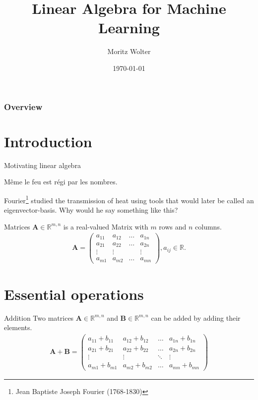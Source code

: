 \documentclass[notes=only]{beamer}
\title{Linear Algebra for Machine Learning}
\date{\today}
\institute{High-Performance Computing and Analytics Lab, University of Bonn}
\author{Moritz Wolter}
\begin{document}
    \maketitle

    \begin{frame}
    \frametitle{Overview} 
    \tableofcontents
    \end{frame}

    \section{Introduction}
    \begin{frame}{Motivating linear algebra}
      \begin{displayquote}
        Même le feu est régi par les nombres.
      \end{displayquote}
      Fourier\footnote{Jean Baptiste Joseph Fourier (1768-1830)} studied the transmission of heat using tools that would later be called
      an eigenvector-basis.
      Why would he say something like this?
    \end{frame}

    \begin{frame}{Matrices}
      $\mathbf{A} \in \mathbb{R}^{m,n}$ is a real-valued Matrix with $m$ rows and $n$ columns.
      \begin{align}
        \mathbf{A} = \begin{pmatrix}
          a_{11} & a_{12} & \dots & a_{1n} \\
          a_{21} & a_{22} & \dots & a_{2n} \\
          \vdots & \vdots &       & \vdots \\
          a_{m1} & a_{m2} & \dots & a_{mn}
        \end{pmatrix}
      , a_{ij} \in \mathbb{R}.
      \end{align}
     \end{frame}


    \section{Essential operations}
    \begin{frame}{Addition}
      Two matrices $\mathbf{A} \in \mathbb{R}^{m,n}$ and $\mathbf{B} \in \mathbb{R}^{m,n}$ can be added by adding their elements.
      \begin{align}
        \mathbf{A} + \mathbf{B} =
        \begin{pmatrix}
            a_{11} + b_{11} & a_{12} + b_{12} & \dots & a_{1n} + b_{1n} \\
            a_{21} + b_{21} & a_{22} + b_{22} & \dots & a_{2n} + b_{2n} \\
            \vdots          & \vdots          & \ddots & \vdots         \\
            a_{m1} + b_{m1} & a_{m2} + b_{m2} & \dots & a_{mn} + b_{mn}
          \end{pmatrix}
        \end{align}
    \end{frame}
\end{document}
